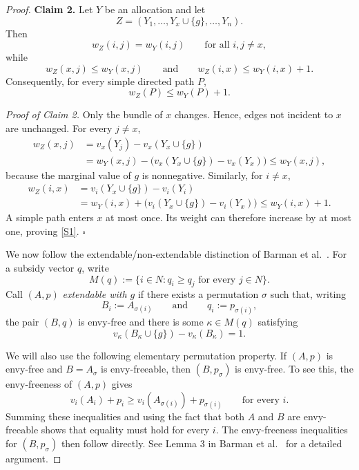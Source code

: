 \documentclass[sigconf,anonymous,nonacm]{aamas}
\begin{document}
\begin{proof}
\medskip
\noindent
\textbf{Claim 2.}
Let $Y$ be an allocation and let
\[
Z=(Y_1,\ldots,Y_x\cup\{g\},\ldots,Y_n).
\]
Then
\[
w_Z(i,j)=w_Y(i,j)
\qquad
\text{for all }i,j\neq x,
\]
while
\[
w_Z(x,j)\leq w_Y(x,j)
\qquad\text{and}\qquad
w_Z(i,x)\leq w_Y(i,x)+1.
\]
Consequently, for every simple directed path $P$,
\begin{equation}\label{S1}
    w_Z(P)\leq w_Y(P)+1.
\end{equation}

\smallskip
\noindent
\emph{Proof of Claim 2.}
Only the bundle of $x$ changes. Hence, edges not incident to $x$ are unchanged. For every $j\neq x$,
\[
\begin{aligned}
w_Z(x,j)
&=v_x(Y_j)-v_x(Y_x\cup\{g\})\\
&=w_Y(x,j)
-\bigl(v_x(Y_x\cup\{g\})-v_x(Y_x)\bigr)
\leq w_Y(x,j),
\end{aligned}
\]
because the marginal value of $g$ is nonnegative. Similarly, for
$i\neq x$,
\[
\begin{aligned}
w_Z(i,x)
&=v_i(Y_x\cup\{g\})-v_i(Y_i)\\
&=w_Y(i,x)
+\bigl(v_i(Y_x\cup\{g\})-v_i(Y_x)\bigr)
\leq w_Y(i,x)+1.
\end{aligned}
\]
A simple path enters $x$ at most once. Its weight can therefore increase by at most one, proving \eqref{S1}.
\hfill$\square$

\medskip
We now follow the extendable/non-extendable distinction of Barman et al.~\cite{BKNS22}. For a subsidy vector $q$, write
\[
M(q):=\{i\in N:q_i\geq q_j\text{ for every }j\in N\}.
\]
Call $(A,p)$ \emph{extendable with $g$} if there exists a permutation $\sigma$ such that, writing
\[
B_i:=A_{\sigma(i)}
\qquad\text{and}\qquad
q_i:=p_{\sigma(i)},
\]
the pair $(B,q)$ is envy-free and there is some
$\kappa\in M(q)$ satisfying
\begin{equation}\label{S2}
 v_\kappa(B_\kappa\cup\{g\})-v_\kappa(B_\kappa)=1.   
\end{equation}


We will also use the following elementary permutation property. If $(A,p)$ is envy-free and $B=A_\sigma$ is envy-freeable, then $(B,p_\sigma)$ is envy-free. To see this, the envy-freeness of
$(A,p)$ gives
\[
v_i(A_i)+p_i
\geq
v_i(A_{\sigma(i)})+p_{\sigma(i)}
\qquad\text{for every }i.
\]
Summing these inequalities and using the fact that both $A$ and $B$ are envy-freeable shows that equality must hold for every $i$. The envy-freeness inequalities for $(B,p_\sigma)$ then follow directly. See Lemma 3 in Barman et al.~\cite{BKNS22} for a detailed argument. 


\end{proof}
\end{document}
